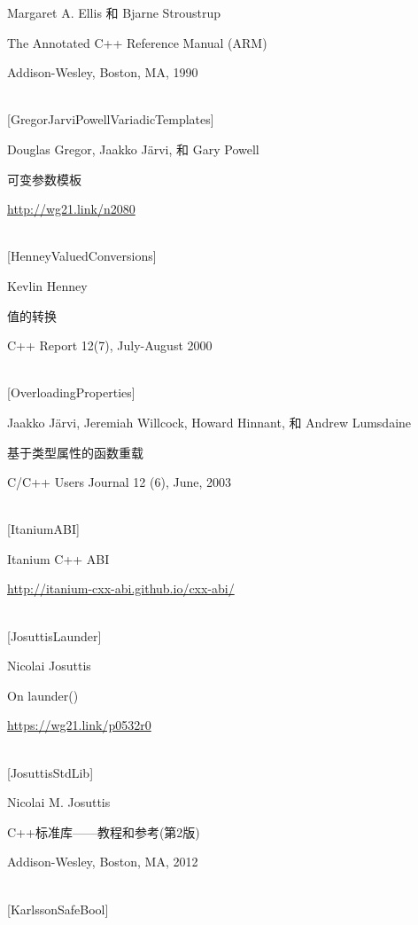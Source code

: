 Margaret A. Ellis 和 Bjarne Stroustrup

The Annotated C++ Reference Manual (ARM)

Addison-Wesley, Boston, MA, 1990

\hspace*{\fill} \\ %
{[GregorJarviPowellVariadicTemplates]}

Douglas Gregor, Jaakko J{\"a}rvi, 和 Gary Powell 

可变参数模板

\url{http://wg21.link/n2080}

\hspace*{\fill} \\ %
{[HenneyValuedConversions]}

Kevlin Henney

值的转换

C++ Report 12(7), July-August 2000

\hspace*{\fill} \\ %
{[OverloadingProperties]}

Jaakko J{\"a}rvi, Jeremiah Willcock, Howard Hinnant, 和 Andrew Lumsdaine

基于类型属性的函数重载

C/C++ Users Journal 12 (6), June, 2003

\hspace*{\fill} \\ %
{[ItaniumABI]}

Itanium C++ ABI

\url{http://itanium-cxx-abi.github.io/cxx-abi/}

\hspace*{\fill} \\ %
{[JosuttisLaunder]}

Nicolai Josuttis

On launder()

\url{https://wg21.link/p0532r0}

\hspace*{\fill} \\ %
{[JosuttisStdLib]}

Nicolai M. Josuttis

C++标准库——教程和参考(第2版)

Addison-Wesley, Boston, MA, 2012

\hspace*{\fill} \\ %
{[KarlssonSafeBool]}

